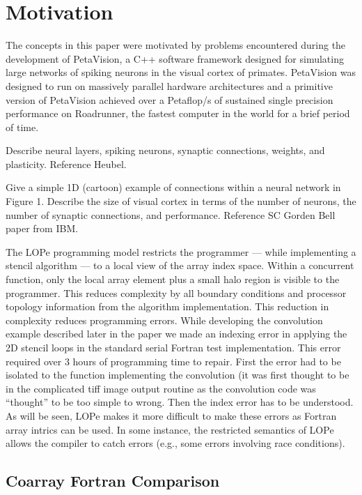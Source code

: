 \section{Motivation}

The concepts in this paper were motivated by problems encountered during
the development of PetaVision, a C++ software framework designed for simulating
large networks of spiking neurons in the visual cortex of primates.  PetaVision
was designed to run on massively parallel hardware architectures and a primitive
version of PetaVision achieved over a Petaflop/s of sustained single precision
performance on Roadrunner, the fastest computer in the world for a brief
period of time.

Describe neural layers, spiking neurons, synaptic connections, weights,
and plasticity.  Reference Heubel.

Give a simple 1D (cartoon) example of connections within a neural network in
Figure 1.  Describe the size of visual cortex in terms of the number of neurons,
the number of synaptic connections, and performance.  Reference SC Gorden Bell
paper from IBM.

The LOPe programming model restricts the programmer --- while implementing a stencil
algorithm --- to a local view of the array index space.  Within a concurrent function,
only the local array element plus a small halo region is visible to the programmer.
This reduces complexity by all boundary conditions and processor topology information
from the algorithm implementation.  This reduction in complexity reduces programming
errors.  While developing the convolution example described later in the paper we
made an indexing error in applying the 2D stencil loops in the standard serial 
Fortran test implementation.  This error required over 3 hours of programming time
to repair.  First the error had to be isolated to the function implementing the
convolution (it was first thought to be in the complicated tiff image output routine
as the convolution code was ``thought'' to be too simple to wrong.  Then the index
error has to be understood.  As will be seen, LOPe makes it more difficult to make
these errors as Fortran array intrics can be used.  In some instance, the restricted
semantics of LOPe allows the compiler to catch errors (e.g., some errors involving
race conditions).


\subsection{Coarray Fortran Comparison}

